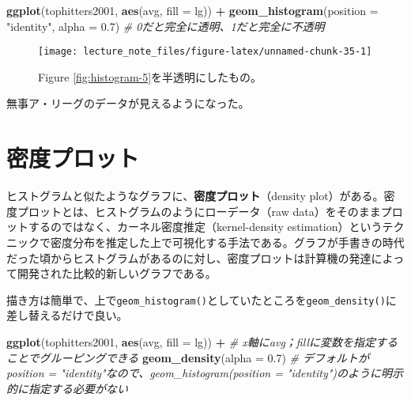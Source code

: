 \documentclass[]{book}
\newenvironment{Shaded}{\begin{snugshade}}{\end{snugshade}}
\newcommand{\KeywordTok}[1]{\textcolor[rgb]{0.13,0.29,0.53}{\textbf{#1}}}
\newcommand{\DataTypeTok}[1]{\textcolor[rgb]{0.13,0.29,0.53}{#1}}
\newcommand{\FloatTok}[1]{\textcolor[rgb]{0.00,0.00,0.81}{#1}}
\newcommand{\StringTok}[1]{\textcolor[rgb]{0.31,0.60,0.02}{#1}}
\newcommand{\CommentTok}[1]{\textcolor[rgb]{0.56,0.35,0.01}{\textit{#1}}}
\newcommand{\OperatorTok}[1]{\textcolor[rgb]{0.81,0.36,0.00}{\textbf{#1}}}
\newcommand{\NormalTok}[1]{#1}
\begin{document}
\begin{Shaded}
\begin{Highlighting}[]
\KeywordTok{ggplot}\NormalTok{(tophitters2001, }\KeywordTok{aes}\NormalTok{(avg, }\DataTypeTok{fill =}\NormalTok{ lg)) }\OperatorTok{+}
\StringTok{  }\KeywordTok{geom_histogram}\NormalTok{(}\DataTypeTok{position =} \StringTok{"identity"}\NormalTok{, }\DataTypeTok{alpha =} \FloatTok{0.7}\NormalTok{) }\CommentTok{# 0だと完全に透明、1だと完全に不透明}
\end{Highlighting}
\end{Shaded}

\begin{figure}

{\centering \texttt{[image: lecture\_note\_files/figure-latex/unnamed-chunk-35-1]} 

}

\caption{Figure \ref{fig:histogram-5}を半透明にしたもの。}\label{fig:unnamed-chunk-35}
\end{figure}

無事ア・リーグのデータが見えるようになった。

\section{密度プロット}

ヒストグラムと似たようなグラフに、\textbf{密度プロット}（density
plot）がある。密度プロットとは、ヒストグラムのようにローデータ（raw
data）をそのままプロットするのではなく、カーネル密度推定（kernel-density
estimation）というテクニックで密度分布を推定した上で可視化する手法である。グラフが手書きの時代だった頃からヒストグラムがあるのに対し、密度プロットは計算機の発達によって開発された比較的新しいグラフである。

描き方は簡単で、上で\texttt{geom\_histogram()}としていたところを\texttt{geom\_density()}に差し替えるだけで良い。



\begin{Shaded}
\begin{Highlighting}[]
\KeywordTok{ggplot}\NormalTok{(tophitters2001, }\KeywordTok{aes}\NormalTok{(avg, }\DataTypeTok{fill =}\NormalTok{ lg)) }\OperatorTok{+}\StringTok{ }\CommentTok{# x軸にavg；fillに変数を指定することでグルーピングできる}
\StringTok{  }\KeywordTok{geom_density}\NormalTok{(}\DataTypeTok{alpha =} \FloatTok{0.7}\NormalTok{) }\CommentTok{# デフォルトがposition = "identity"なので、geom_histogram(position = "identity")のように明示的に指定する必要がない}
\end{Highlighting}
\end{Shaded}
\end{document}

